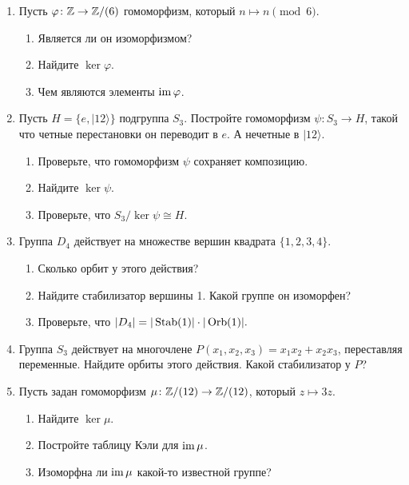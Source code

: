 \begin{enumerate}
    \item Пусть $\varphi \colon \mathbb Z \to \mathbb Z/(6)$ гомоморфизм, который $n \mapsto n \pmod 6.$
        \begin{enumerate}
            \item Является ли он изоморфизмом?
            \item Найдите $\ker \varphi.$
            \item Чем являются элементы $\operatorname{im} \varphi$.
        \end{enumerate}
    \item Пусть $H = \{e, |1 2\rangle \}$ подгруппа $S_3$. Постройте гомоморфизм
         $\psi \colon S_3 \to H$, такой что четные перестановки он переводит в  $e.$
         А нечетные в $|1 2 \rangle$. 
         \begin{enumerate}
             \item Проверьте, что гомоморфизм $\psi$ сохраняет композицию.
             \item Найдите $\ker \psi$.
             \item Проверьте, что $S_3/\ker\psi \cong H$.
         \end{enumerate}
     \item Группа $D_4$ действует на множестве вершин квадрата $\{1, 2, 3, 4\}$.
         \begin{enumerate}
             \item Сколько орбит у этого действия?
             \item Найдите стабилизатор вершины 1. Какой группе он изоморфен?
             \item Проверьте, что \(
             |D_4| = |\operatorname{Stab}(1)| \cdot |\operatorname{Orb}(1)|
             .\)
         \end{enumerate}
     \item Группа $S_3$ действует на многочлене $P(x_1, x_2, x_3) = x_1x_2 + x_2x_3$,
         переставляя переменные. Найдите орбиты этого действия. Какой стабилизатор у $P$?
     \item Пусть задан гомоморфизм $\mu \colon \mathbb Z/(12) \to \mathbb Z/(12)$, который $z \mapsto 3z$.
         \begin{enumerate}
             \item Найдите $\ker \mu$.
             \item Постройте таблицу Кэли для $\operatorname{im} \mu$.
             \item Изоморфна ли $\operatorname{im} \mu$ какой-то известной группе?
         \end{enumerate}

\end{enumerate}
